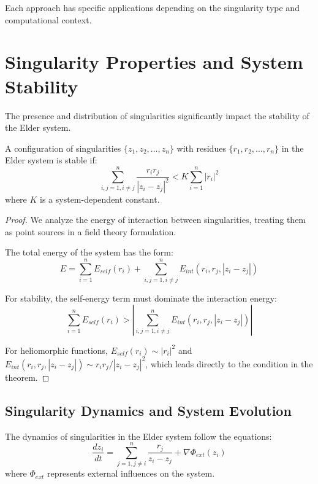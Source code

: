 Each approach has specific applications depending on the singularity type and computational context.

\section{Singularity Properties and System Stability}

The presence and distribution of singularities significantly impact the stability of the Elder system.

\begin{theorem}
A configuration of singularities $\{z_1, z_2, \ldots, z_n\}$ with residues $\{r_1, r_2, \ldots, r_n\}$ in the Elder system is stable if:
\begin{equation}
\sum_{i,j=1, i \neq j}^n \frac{r_i r_j}{|z_i - z_j|^2} < K \sum_{i=1}^n |r_i|^2
\end{equation}
where $K$ is a system-dependent constant.
\end{theorem}

\begin{proof}
We analyze the energy of interaction between singularities, treating them as point sources in a field theory formulation.

The total energy of the system has the form:
\begin{equation}
E = \sum_{i=1}^n E_{self}(r_i) + \sum_{i,j=1, i \neq j}^n E_{int}(r_i, r_j, |z_i - z_j|)
\end{equation}

For stability, the self-energy term must dominate the interaction energy:
\begin{equation}
\sum_{i=1}^n E_{self}(r_i) > \left|\sum_{i,j=1, i \neq j}^n E_{int}(r_i, r_j, |z_i - z_j|)\right|
\end{equation}

For heliomorphic functions, $E_{self}(r_i) \sim |r_i|^2$ and $E_{int}(r_i, r_j, |z_i - z_j|) \sim r_i r_j / |z_i - z_j|^2$, which leads directly to the condition in the theorem.
\end{proof}

\subsection{Singularity Dynamics and System Evolution}

\begin{theorem}
The dynamics of singularities in the Elder system follow the equations:
\begin{equation}
\frac{dz_i}{dt} = \sum_{j=1, j \neq i}^n \frac{r_j}{z_i - z_j} + \nabla \Phi_{ext}(z_i)
\end{equation}
where $\Phi_{ext}$ represents external influences on the system.
\end{theorem}

